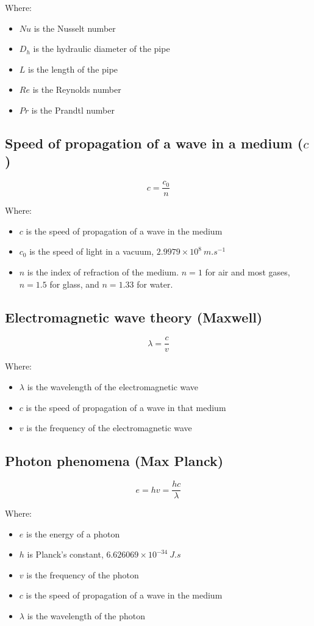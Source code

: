 \documentclass[11pt]{article}
\begin{document}
Where:
\begin{itemize}
\item \(Nu\) is the Nusselt number
\item \(D_h\) is the hydraulic diameter of the pipe
\item \(L\) is the length of the pipe
\item \(Re\) is the Reynolds number
\item \(Pr\) is the Prandtl number
\end{itemize}

\subsection{Speed of propagation of a wave in a medium (\(c\))}
\label{sec:orgbaeb480}
\[c = \frac{c_0}{n}\]

Where:
\begin{itemize}
\item \(c\) is the speed of propagation of a wave in the medium
\item \(c_0\) is the speed of light in a vacuum, \(2.9979 \times 10^8 \ \unit{m.s^{-1}}\)
\item \(n\) is the index of refraction of the medium. \(n = 1\) for air and most gases, \(n = 1.5\) for glass, and \(n = 1.33\) for water.
\end{itemize}

\subsection{Electromagnetic wave theory (Maxwell)}
\label{sec:orga8de3b4}
\[\lambda = \frac{c}{v}\]

Where:
\begin{itemize}
\item \(\lambda\) is the wavelength of the electromagnetic wave
\item \(c\) is the speed of propagation of a wave in that medium
\item \(v\) is the frequency of the electromagnetic wave
\end{itemize}

\subsection{Photon phenomena (Max Planck)}
\label{sec:orgd7a062e}
\[e = hv = \frac{hc}{\lambda}\]

Where:
\begin{itemize}
\item \(e\) is the energy of a photon
\item \(h\) is Planck's constant, \(6.626069 \times 10^{-34} \ \unit{J.s}\)
\item \(v\) is the frequency of the photon
\item \(c\) is the speed of propagation of a wave in the medium
\item \(\lambda\) is the wavelength of the photon
\end{itemize}
\end{document}
